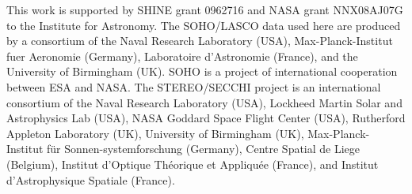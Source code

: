 \documentclass[preprint2]{aastex}
\begin{document}


\acknowledgments

This work is supported by SHINE grant 0962716 and NASA grant NNX08AJ07G to the Institute for Astronomy. The SOHO/LASCO data used here are produced by a consortium of the Naval Research Laboratory (USA), Max-Planck-Institut fuer Aeronomie (Germany), Laboratoire d'Astronomie (France), and the University of Birmingham (UK). SOHO is a project of international cooperation between ESA and NASA. The STEREO/SECCHI project is an international consortium of the Naval Research Laboratory (USA), Lockheed Martin Solar and Astrophysics Lab (USA), NASA Goddard Space Flight Center (USA), Rutherford Appleton Laboratory (UK), University of Birmingham (UK), Max-Planck-Institut f\"{u}r Sonnen-systemforschung (Germany), Centre Spatial de Liege (Belgium), Institut d'Optique Th\'{e}orique et Appliqu\'{e}e (France), and Institut d'Astrophysique Spatiale (France). 




\end{document}
